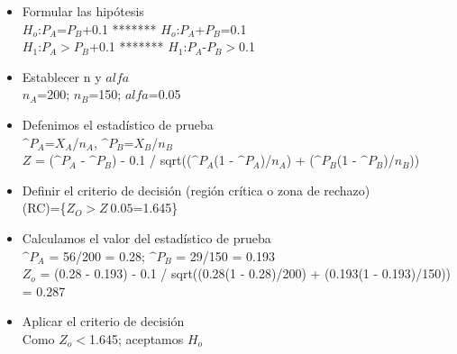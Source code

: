 \documentclass[12pt,letterpaper]{article}\usepackage[]{graphicx}\usepackage[]{color}
\begin{document}
\begin{itemize}
  \item Formular las hip\'otesis\\
  $H_o$:$P_A$=$P_B$+0.1 ******* $H_o$:$P_A$+$P_B$=0.1\\
  $H_1$:$P_A$$>$$P_B$+0.1 ******* $H_1$:$P_A$-$P_B$$>$0.1
  \item Establecer n y $alfa$\\
  $n_A$=200; $n_B$=150; $alfa$=0.05
  \item Defenimos el estad\'istico de prueba\\
  $\^ P_A$=$X_A$/$n_A$, $\^ P_B$=$X_B$/$n_B$\\
  $Z$ = ($\^ P_A$ - $\^ P_B$) - 0.1 / sqrt(($\^ P_A$(1 - $\^ P_A$)/$n_A$) + ($\^ P_B$(1 - $\^ P_B$)/$n_B$)) 
  \item Definir el criterio de decisi\'on (regi\'on cr\'itica o zona de rechazo)\\
  (RC)=\{$Z_O$$>$$Z_\ 0.05$=1.645\}
  \item Calculamos el valor del estad\'istico de prueba\\
  $\^ P_A$ = 56/200 = 0.28;  $\^ P_B$ = 29/150 = 0.193\\
  $Z_o$ = (0.28 - 0.193) - 0.1 / sqrt((0.28(1 - 0.28)/200) + (0.193(1 - 0.193)/150)) = 0.287
  \item Aplicar el criterio de decisi\'on\\
  Como $Z_o$$<$1.645; aceptamos $H_o$
\end{itemize}
\end{document}
